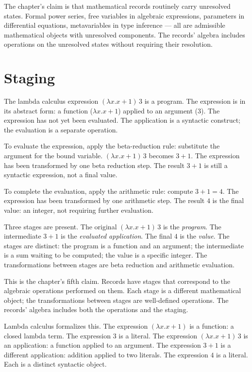 The chapter's claim is that mathematical records routinely carry
unresolved states. Formal power series, free variables in
algebraic expressions, parameters in differential equations,
metavariables in type inference --- all are admissible mathematical
objects with unresolved components. The records' algebra includes
operations on the unresolved states without requiring their
resolution.

\section{Staging}
\label{se:staging}

The lambda calculus expression $(\lambda x. x + 1) \, 3$ is a program. The
expression is in its abstract form: a function ($\lambda x. x + 1$)
applied to an argument ($3$). The expression has not yet been
evaluated. The application is a syntactic construct; the evaluation
is a separate operation.

To evaluate the expression, apply the beta-reduction rule:
substitute the argument for the bound variable. $(\lambda x. x + 1) \,
3$ becomes $3 + 1$. The expression has been transformed by one beta
reduction step. The result $3 + 1$ is still a syntactic expression,
not a final value.

To complete the evaluation, apply the arithmetic rule: compute $3 + 1
= 4$. The expression has been transformed by one arithmetic step. The
result $4$ is the final value: an integer, not requiring further
evaluation.

Three stages are present. The original $(\lambda x. x + 1) \, 3$ is the
\emph{program}. The intermediate $3 + 1$ is the \emph{evaluated
application}. The final $4$ is the \emph{value}. The stages are
distinct: the program is a function and an argument; the
intermediate is a sum waiting to be computed; the value is a
specific integer. The transformations between stages are beta
reduction and arithmetic evaluation.

This is the chapter's fifth claim. Records have stages that
correspond to the algebraic operations performed on them. Each
stage is a different mathematical object; the transformations
between stages are well-defined operations. The records' algebra
includes both the operations and the staging.

Lambda calculus formalizes this. The expression $(\lambda x. x + 1)$ is
a function: a closed lambda term. The expression $3$ is a literal.
The expression $(\lambda x. x + 1) \, 3$ is an application: a function
applied to an argument. The expression $3 + 1$ is a different
application: addition applied to two literals. The expression $4$ is
a literal. Each is a distinct syntactic object.

